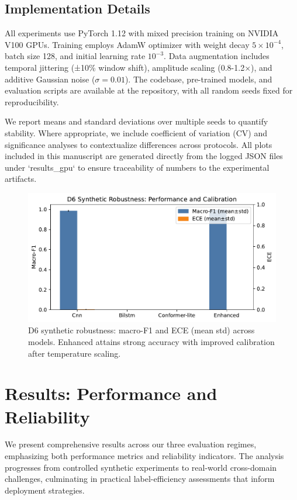 \documentclass[journal]{IEEEtran}
\begin{document}
\subsection{Implementation Details}
All experiments use PyTorch 1.12 with mixed precision training on NVIDIA V100 GPUs. Training employs AdamW optimizer with weight decay $5 \times 10^{-4}$, batch size 128, and initial learning rate $10^{-3}$. Data augmentation includes temporal jittering (±10\% window shift), amplitude scaling (0.8-1.2×), and additive Gaussian noise ($\sigma=0.01$). The codebase, pre-trained models, and evaluation scripts are available at the repository, with all random seeds fixed for reproducibility.

We report means and standard deviations over multiple seeds to quantify stability. Where appropriate, we include coefficient of variation (CV) and significance analyses to contextualize differences across protocols. All plots included in this manuscript are generated directly from the logged JSON files under `results\_gpu` to ensure traceability of numbers to the experimental artifacts.

\begin{figure}[t]
\centering
\includegraphics[width=\columnwidth]{plots/d6_calibration_summary.pdf}
\caption{D6 synthetic robustness: macro-F1 and ECE (mean\,\textpm\,std) across models. Enhanced attains strong accuracy with improved calibration after temperature scaling.}
\label{fig:d6_cal}
\end{figure}

\section{Results: Performance and Reliability}
We present comprehensive results across our three evaluation regimes, emphasizing both performance metrics and reliability indicators. The analysis progresses from controlled synthetic experiments to real-world cross-domain challenges, culminating in practical label-efficiency assessments that inform deployment strategies.
\end{document}
